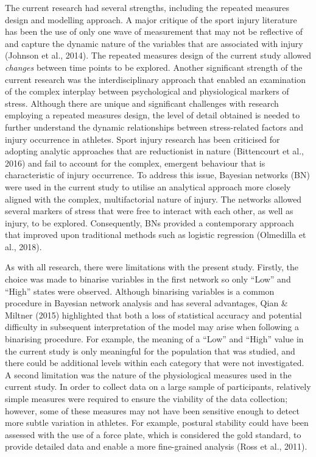 \documentclass[
  english,
  man,floatsintext]{apa6}
\begin{document}
The current research had several strengths, including the repeated measures design and modelling approach.
A major critique of the sport injury literature has been the use of only one wave of measurement that may not be reflective of and capture the dynamic nature of the variables that are associated with injury (Johnson et al., 2014).
The repeated measures design of the current study allowed \emph{changes} between time points to be explored.
Another significant strength of the current research was the interdisciplinary approach that enabled an examination of the complex interplay between psychological and physiological markers of stress.
Although there are unique and significant challenges with research employing a repeated measures design, the level of detail obtained is needed to further understand the dynamic relationships between stress-related factors and injury occurrence in athletes.
Sport injury research has been criticised for adopting analytic approaches that are reductionist in nature (Bittencourt et al., 2016) and fail to account for the complex, emergent behaviour that is characteristic of injury occurrence.
To address this issue, Bayesian networks (BN) were used in the current study to utilise an analytical approach more closely aligned with the complex, multifactorial nature of injury.
The networks allowed several markers of stress that were free to interact with each other, as well as injury, to be explored.
Consequently, BNs provided a contemporary approach that improved upon traditional methods such as logistic regression (Olmedilla et al., 2018).

As with all research, there were limitations with the present study.
Firstly, the choice was made to binarise variables in the first network so only \enquote{Low} and \enquote{High} states were observed.
Although binarising variables is a common procedure in Bayesian network analysis and has several advantages, Qian \& Miltner (2015) highlighted that both a loss of statistical accuracy and potential difficulty in subsequent interpretation of the model may arise when following a binarising procedure.
For example, the meaning of a \enquote{Low} and \enquote{High} value in the current study is only meaningful for the population that was studied, and there could be additional levels within each category that were not investigated.
A second limitation was the nature of the physiological measures used in the current study.
In order to collect data on a large sample of participants, relatively simple measures were required to ensure the viability of the data collection; however, some of these measures may not have been sensitive enough to detect more subtle variation in athletes.
For example, postural stability could have been assessed with the use of a force plate, which is considered the gold standard, to provide detailed data and enable a more fine-grained analysis (Ross et al., 2011).
\end{document}
